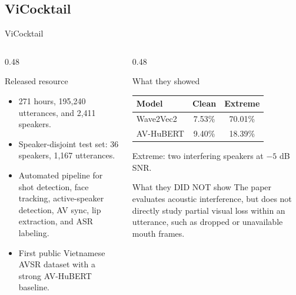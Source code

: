 \subsection{ViCocktail}

\begin{frame}{ViCocktail}
  \small
  \begin{columns}[T,onlytextwidth]
    \begin{column}{0.48\textwidth}
      \begin{block}{Released resource}
        \begin{itemize}
          \item 271 hours, 195,240 utterances, and 2,411 speakers.
          \item Speaker-disjoint test set: 36 speakers, 1,167 utterances.
          \item Automated pipeline for shot detection, face tracking, active-speaker detection, AV sync, lip extraction, and ASR labeling.
          \item First public Vietnamese AVSR dataset with a strong AV-HuBERT baseline.
        \end{itemize}
      \end{block}
    \end{column}
    \begin{column}{0.48\textwidth}
      \begin{block}{What they showed}
        \centering
        \begin{tabular}{lcc}
          \toprule
          Model & Clean & Extreme \\
          \midrule
          Wave2Vec2 & 7.53\% & 70.01\% \\
          AV-HuBERT & 9.40\% & 18.39\% \\
          \bottomrule
        \end{tabular}
        \vspace{0.10cm}

        {\scriptsize Extreme: two interfering speakers at $-5$ dB SNR.}
      \end{block}
      \begin{alertblock}{What they DID NOT show}
        The paper evaluates acoustic interference, but does not directly study partial visual loss within an utterance, such as dropped or unavailable mouth frames.
      \end{alertblock}
    \end{column}
  \end{columns}
\end{frame}
